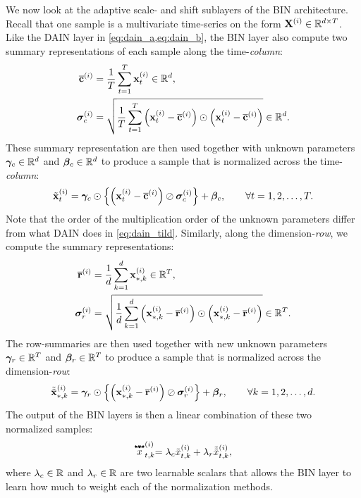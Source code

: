 \documentclass{statsmsc}
\begin{document}
{We now look at the adaptive scale- and shift sublayers of the \ac{BIN} architecture.
Recall that one sample is a multivariate time-series on the form $\mathbf{X}^{(i)} \in \mathbb{R}^{d \times T}$.
Like the \ac{DAIN} layer in \cref{eq:dain_a,eq:dain_b}, the \ac{BIN} layer also
compute two summary representations of each sample along the time-\textit{column}:
\begin{align}
    \overline{\mathbf{c}}^{(i)}& =\frac{1}{T} \sum^{T}_{t=1} \mathbf{x}_t^{(i)} \in \mathbb{R}^d, \\
    \bm\sigma_c^{(i)}&=\sqrt{
    \frac{1}{T} \sum^{T}_{t=1} \left(\mathbf{x}^{(i)}_{t} - \overline{\mathbf{c}}^{(i)} \right)
    \odot \left(\mathbf{x}^{(i)}_{t} - \overline{\mathbf{c}}^{(i)} \right)
} \in \mathbb{R}^d.
\end{align}
These summary representation are then used together with unknown parameters
$\bm\gamma_c \in \mathbb{R}^d$ and $\bm\beta_c \in \mathbb{R}^d$ to produce a sample that is normalized across
the time-\textit{column}:
\begin{equation}
    \tilde{\mathbf{x}}^{(i)}_t= \bm\gamma_c \odot \left\{
        \left(\mathbf{x}^{(i)}_t - \overline{\mathbf{c}}^{(i)}\right)\oslash \bm\sigma_c^{(i)}
    \right\}+\bm\beta_c, \qquad \forall t=1,2,\dots,T.
\end{equation}
Note that the order of the multiplication order of the unknown parameters differ from what
\ac{DAIN} does in \cref{eq:dain_tild}. Similarly, along the dimension-\textit{row}, we compute
the summary representations:
\begin{align}
    \overline{\mathbf{r}}^{(i)}& =\frac{1}{d} \sum^{d}_{k=1} \mathbf{x}_{*,k}^{(i)} \in \mathbb{R}^T, \\
    \bm\sigma_r^{(i)}&=\sqrt{
        \frac{1}{d} \sum^{d}_{k=1} \left(\mathbf{x}^{(i)}_{*,k} - \overline{\mathbf{r}}^{(i)} \right)
        \odot \left(\mathbf{x}^{(i)}_{*,k} - \overline{\mathbf{r}}^{(i)} \right)
    } \in \mathbb{R}^T.
\end{align}
The row-summaries are then used together with new unknown parameters
$\bm\gamma_r \in \mathbb{R}^T$ and $\bm\beta_r \in \mathbb{R}^T$ to produce
a sample that is normalized across the dimension-\textit{row}:
\begin{equation}
    \tilde{\tilde{\mathbf{x}}}^{(i)}_{*,k}= \bm\gamma_r \odot \left\{
        \left(\mathbf{x}^{(i)}_{*,k} - \overline{\mathbf{r}}^{(i)}\right)\oslash \bm\sigma_r^{(i)}
    \right\}+\bm\beta_r, \qquad \forall k=1,2,\dots,d.
\end{equation}
The output of the \ac{BIN} layers is then a linear combination of these two normalized samples:
\begin{equation}
    \stackrel{\mathbat}{x}^{(i)}_{t,k} = \lambda_c \tilde{x}^{(i)}_{t,k}
    + \lambda_r \tilde{\tilde{x}}^{(i)}_{t,k},
\end{equation}
where $\lambda_c \in \mathbb{R}$ and $\lambda_r\in\mathbb{R}$ are two learnable scalars that allows the \ac{BIN} layer
to learn how much to weight each of the normalization methods.


}
\end{document}

